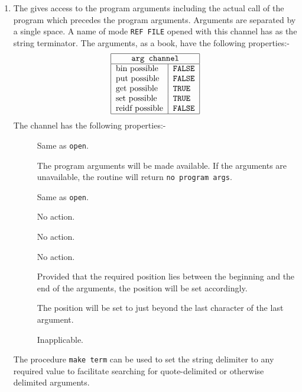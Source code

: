 \begin{enumerate}
\item {}\newline
The  gives access to the program arguments including the actual
call of the program which precedes the program arguments. Arguments are
separated by a single space. A name of mode \verb|REF FILE| opened with
this channel has  as the string terminator. The arguments,
as a book, have the following properties:-
$$\begin{tabular}{|l|l|}\hline
\multicolumn{2}{|c|}{\texttt{arg channel}}\\ \hline
  bin possible & \texttt{FALSE} \\
  put possible & \texttt{FALSE} \\
  get possible & \texttt{TRUE} \\
  set possible & \texttt{TRUE} \\
  reidf possible & \texttt{FALSE}\\ \hline
  \end{tabular}
$$
The channel has the following properties:-
\begin{description}
\item[] Same as \verb|open|.
\item[] The program arguments will be made available. If the
arguments are unavailable, the routine will return
\verb|no program args|.
\item[] Same as \verb|open|.
\item[] No action.
\item[] No action.
\item[] No action.
\item[] Provided that the required position lies between the
beginning and the end of the arguments, the position will be set
accordingly.
\item[] The position will be set to just beyond the last
character of the last argument.
\item[] Inapplicable.
\end{description}
The procedure \verb|make term| can be used to set the string delimiter
to any required value to facilitate searching for quote-delimited or
otherwise delimited arguments.


\end{enumerate}
